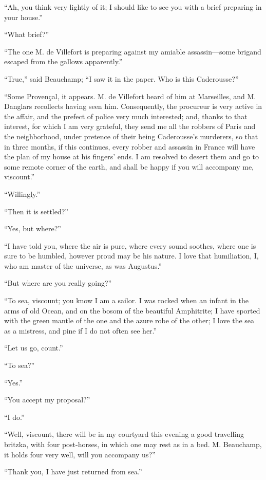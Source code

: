 “Ah, you think very lightly of it; I should like to see you with a
brief preparing in your house.”

“What brief?”

“The one M. de Villefort is preparing against my amiable assassin—some
brigand escaped from the gallows apparently.”

“True,” said Beauchamp; “I saw it in the paper. Who is this
Caderousse?”

“Some Provençal, it appears. M. de Villefort heard of him at
Marseilles, and M. Danglars recollects having seen him. Consequently,
the procureur is very active in the affair, and the prefect of police
very much interested; and, thanks to that interest, for which I am very
grateful, they send me all the robbers of Paris and the neighborhood,
under pretence of their being Caderousse’s murderers, so that in three
months, if this continues, every robber and assassin in France will
have the plan of my house at his fingers’ ends. I am resolved to desert
them and go to some remote corner of the earth, and shall be happy if
you will accompany me, viscount.”

“Willingly.”

“Then it is settled?”

“Yes, but where?”

“I have told you, where the air is pure, where every sound soothes,
where one is sure to be humbled, however proud may be his nature. I
love that humiliation, I, who am master of the universe, as was
Augustus.”

“But where are you really going?”

“To sea, viscount; you know I am a sailor. I was rocked when an infant
in the arms of old Ocean, and on the bosom of the beautiful Amphitrite;
I have sported with the green mantle of the one and the azure robe of
the other; I love the sea as a mistress, and pine if I do not often see
her.”

“Let us go, count.”

“To sea?”

“Yes.”

“You accept my proposal?”

“I do.”

“Well, viscount, there will be in my courtyard this evening a good
travelling britzka, with four post-horses, in which one may rest as in
a bed. M. Beauchamp, it holds four very well, will you accompany us?”

“Thank you, I have just returned from sea.”

